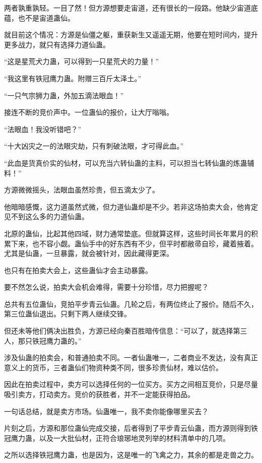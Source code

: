 \begin{this_body}
两者孰重孰轻。一目了然！但方源想要走宙道，还有很长的一段路。他缺少宙道底蕴，也不是宙道蛊仙。

就目前这个情况：方源是仙僵之躯，重获新生又遥遥无期，他要在短时间内，提升更多战力，就只有选择力道仙蛊。

“这是星荒犬力蛊，可以得到一只星荒犬的力量！”

“我这里有铁冠鹰力蛊。附赠三百斤太泽土。”

“一只气宗狮力蛊，外加五滴法眼血！”

接连不断的竞价声中。一位蛊仙的报价，让大厅嗡嗡。

“法眼血！我没听错吧？”

“十大凶灾之一的法眼灾劫，只有刺破法眼，才可得此血。”

“此血是货真价实的仙材，可以充当六转仙蛊的主料，可以担当七转仙蛊的炼蛊辅料！”

方源微微摇头，法眼血虽然珍贵，但五滴太少了。

他暗暗感慨，这力道虽然式微，但力道仙蛊却是不少。若非这场拍卖大会，他肯定见不到这么多的力道仙蛊。

北原的蛊仙，比起其他四域，财力通常垫底。但就算这样，这些时间长年累月的积累下来，也不容小觑。蛊仙手中的好东西有不少，但平时都敝帚自珍，藏着掖着。尤其是仙蛊，一旦暴露，就会被针对，因此藏得更深。

也只有在拍卖大会上，这些蛊仙才会主动暴露。

要不然怎么说，拍卖大会机会难得，需要十分珍惜，尽力把握呢？

总共有五位蛊仙，竞拍平步青云仙蛊。几轮之后，有两位终止了报价。随后不久，第三位蛊仙退出。只剩下两人继续交锋。

但还未等他们俩决出胜负，方源已经向秦百胜暗传信息：“可以了，就选择第三人，那只铁冠鹰力蛊的。”

涉及仙蛊的拍卖会，和普通拍卖不同。一者仙蛊唯一，二者商业不发达，没有真正意义上的货币，三者蛊仙们物资种类不同，很多珍贵仙材，难以估价。

因此在拍卖过程中，卖方可以选择任何的一位买方。买方之间相互竞价，只是尽量吸引卖方，打动卖方。竞价的获胜者，并不一定能获得拍品。

一句话总结，就是卖方市场。仙蛊唯一，我不卖你能像哪里买去？

片刻之后，方源和那位蛊仙完成交接，后者得到了平步青云仙蛊，而方源则得到铁冠鹰力蛊，以及一大批仙材，正符合琅琊地灵列举的材料清单中的几项。

之所以选择铁冠鹰力蛊，也是因为，这是唯一的飞禽之力，其余的都是走兽之力。


\end{this_body}
